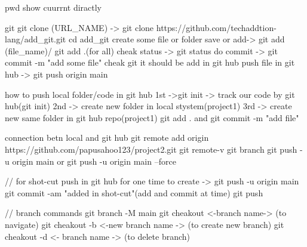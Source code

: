 pwd
show cuurrnt diractly

git   
git clone (URL_NAME) -> git clone https://github.com/techaddtion-lang/add_git.git
cd add_git
create some file or folder
save or add-> git add (file_name)/ git add .(for all)
cheak status -> git status
do commit -> git commit -m "add some file" 
cheak git it should be add in git hub
push file in git hub -> git push  origin main      



how to push local folder/code in git hub 
1st ->git init -> track our code by git hub(git init)
2nd -> create new folder in local stystem(project1)
3rd -> create new same folder in git hub repo(project1)
git add . and git commit -m "add file"

connection betn local and git hub
git remote add origin https://github.com/papusahoo123/project2.git
git remote-v
git branch 
git push -u origin main or git push -u origin main --force   


// for shot-cut push in git hub
for one time to create ->  git push -u origin main 
git commit -am "added in shot-cut"(add and commit at time)
git push 


// branch commands
git branch -M main
git cheakout <-branch name-> (to navigate)
git cheakout -b <-new branch name -> (to create new branch)
git cheakout -d <- branch name -> (to delete  branch)